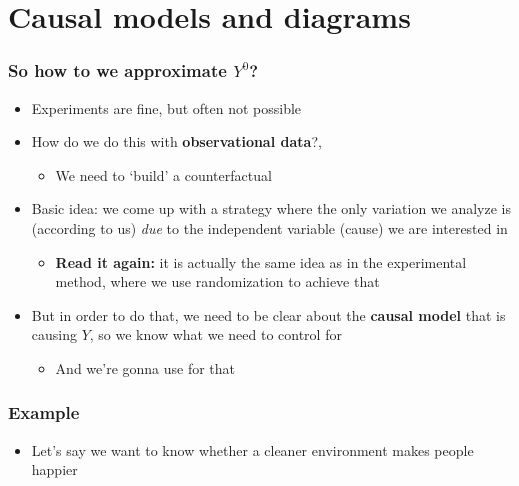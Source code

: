 \documentclass[aspectratio=43]{beamer}
\begin{document}
\section{Causal models and diagrams}

\begin{frame}
\frametitle{So how to we approximate $Y^{0}$?}
\centering

\begin{itemize}
  \item Experiments are fine, but often not possible
  \item<2-> How do we do this with \textbf{observational data}?,
    \begin{itemize}
      \item We need to `build' a counterfactual
    \end{itemize}
  \item<3-> Basic idea: we come up with a strategy where the only variation we analyze is (according to us) \textit{due} to the independent variable (cause) we are interested in
  \begin{itemize}
    \item \textbf{Read it again:} it is actually the same idea as in the experimental method, where we use randomization to achieve that
  \end{itemize}
  \item<4-> But in order to do that, we need to be clear about the \textbf{causal model} that is causing $Y$, so we know what we need to control for
  \begin{itemize}
    \item And we're gonna use  for that
  \end{itemize}
\end{itemize}

\end{frame}


\begin{frame}
\frametitle{Example}
\centering

\begin{itemize}
\item Let's say we want to know whether a cleaner environment makes people happier
\end{itemize}

\end{frame}
\end{document}
